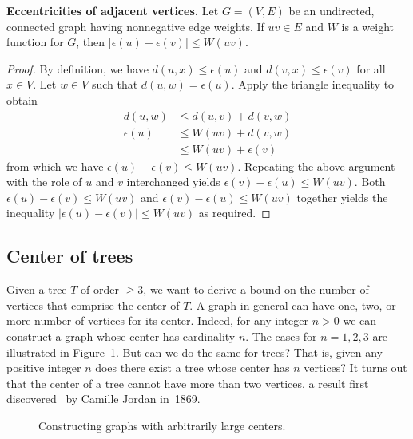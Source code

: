 \begin{theorem}
\textbf{Eccentricities of adjacent vertices.}
Let $G = (V,E)$ be an undirected, connected graph having nonnegative
edge weights. If $uv \in E$ and $W$ is a weight function for $G$, then
$|\epsilon(u) - \epsilon(v)| \leq W(uv)$.
\end{theorem}

\begin{proof}
By definition, we have $d(u,x) \leq \epsilon(u)$ and
$d(v,x) \leq \epsilon(v)$ for all $x \in V$. Let $w \in V$ such that
$d(u,w) = \epsilon(u)$. Apply the triangle inequality to obtain
\begin{align*}
d(u,w) &\leq d(u,v) + d(v,w) \\
\epsilon(u) &\leq W(uv) + d(v,w) \\
            &\leq W(uv) + \epsilon(v)
\end{align*}
from which we have $\epsilon(u) - \epsilon(v) \leq W(uv)$. Repeating
the above argument with the role of $u$ and $v$ interchanged yields
$\epsilon(v) - \epsilon(u) \leq W(uv)$. Both
$\epsilon(u) - \epsilon(v) \leq W(uv)$ and
$\epsilon(v) - \epsilon(u) \leq W(uv)$ together yields the inequality
$|\epsilon(u) - \epsilon(v)| \leq W(uv)$ as required.
\end{proof}



\subsection{Center of trees}

Given a tree $T$ of order $\geq 3$, we want to derive a bound on the
number of vertices that comprise the center of $T$. A graph in general
can have one, two, or more number of vertices for its center. Indeed,
for any integer $n > 0$ we can construct a graph whose center has
cardinality $n$. The cases for $n = 1, 2, 3$ are illustrated in
Figure~\ref{fig:distance_connectivity:graphs_arbitrarily_large_centers}. But
can we do the same for trees? That is, given any positive integer $n$
does there exist a tree whose center has $n$ vertices? It turns out
that the center of a tree cannot have more than two vertices, a result
first discovered~\cite{Jordan1869} by Camille
Jordan in~1869.

\begin{figure}[!htbp]
\centering

\caption{Constructing graphs with arbitrarily large centers.}
\label{fig:distance_connectivity:graphs_arbitrarily_large_centers}
\end{figure}

